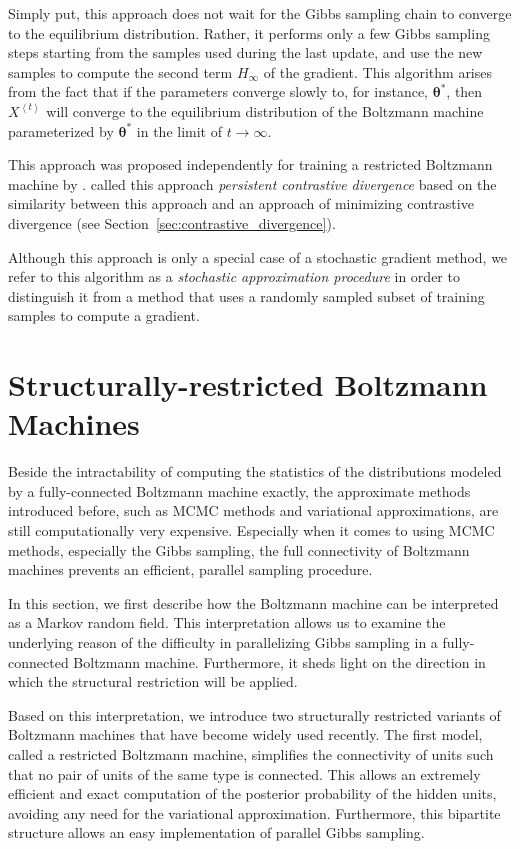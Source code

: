 \documentclass[dissertation,nocontribution,draft*]{aaltoseries}
\newcommand{\qt}[1]{\left<#1\right>}
\newcommand{\vects}[1]{\boldsymbol{#1}}
\newcommand{\TT}[0]{{\vects{\theta}}}
\begin{document}
Simply put, this approach does not wait for the Gibbs
sampling chain to converge to the equilibrium distribution.
Rather, it performs only a few Gibbs sampling steps starting
from the samples used during the last update, and use the
new samples to compute the second term $H_\infty$ of the
gradient. This algorithm arises from the fact that if the
parameters converge slowly to, for instance, $\TT^*$, then
$X^{\qt{t}}$ will converge to the equilibrium distribution of the
Boltzmann machine parameterized by $\TT^*$ in the limit of
$t \to \infty$.

This approach was proposed independently for
training a restricted Boltzmann machine by
\citet{Tieleman2008}.  \citet{Tieleman2008} called this
approach \textit{persistent contrastive divergence} based on
the similarity between this approach and an approach of
minimizing contrastive divergence (see
Section~\ref{sec:contrastive_divergence}).

Although this approach is only a special case of a
stochastic gradient method, we refer to this algorithm as a
\textit{stochastic approximation procedure} in order to
distinguish it from a method that uses a randomly sampled
subset of training samples to compute a gradient.



\section{Structurally-restricted Boltzmann Machines}
\label{sec:srbm}

Beside the intractability of computing the statistics of the
distributions modeled by a fully-connected Boltzmann machine
exactly, the approximate methods introduced before, such as
MCMC methods and variational approximations, are still
computationally very expensive. Especially when it comes to
using MCMC methods, especially the Gibbs sampling, the full
connectivity of Boltzmann machines prevents an efficient,
parallel sampling procedure.

In this section, we first describe how the Boltzmann machine
can be interpreted as a Markov random field. This
interpretation allows us to examine the underlying reason of
the difficulty in parallelizing Gibbs sampling in a
fully-connected Boltzmann machine. Furthermore, it sheds
light on the
direction in which the structural restriction will be applied.

Based on this interpretation, we introduce two structurally
restricted variants of Boltzmann machines that have become
widely used recently. The first model, called a restricted
Boltzmann machine, simplifies the connectivity of units such
that no pair of units of the same type is connected. This
allows an extremely efficient and exact computation of the
posterior probability of the hidden units, avoiding any need
for the variational approximation. Furthermore, this
bipartite structure allows an easy implementation of
parallel Gibbs sampling.
\end{document}
